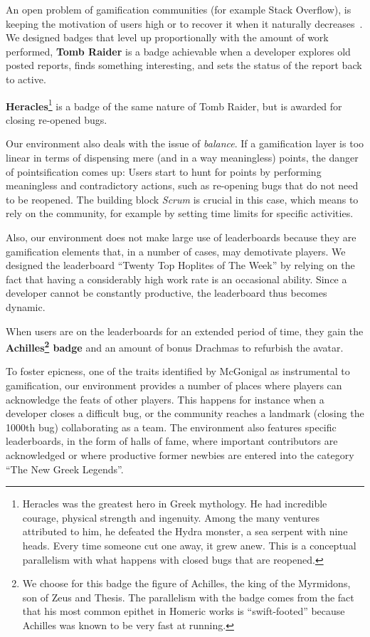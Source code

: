  An open problem of gamification communities (for example Stack Overflow), is keeping the motivation of users high or to recover it when it naturally decreases~\cite{Grant2013}.
We designed badges that level up proportionally with the amount of work performed, \eg \textbf{Tomb Raider} is a badge achievable when a developer explores old posted reports, finds something interesting, and sets the status of the report back to active.

 \textbf{Heracles}\footnote{Heracles was the greatest hero in Greek mythology.
He had incredible courage, physical strength and ingenuity.
Among the many ventures attributed to him, he defeated the Hydra monster, a sea serpent with nine heads.
Every time someone cut one away, it grew anew.
This is a conceptual parallelism with what happens with closed bugs that are reopened.} is a badge of the same nature of Tomb Raider, but is awarded for closing re-opened bugs.

Our environment also deals with the issue of \emph{balance}.
If a gamification layer is too linear in terms of dispensing mere (and in a way meaningless) points, the danger of pointsification comes up: Users start to hunt for points by performing meaningless and contradictory actions, such as re-opening bugs that do not need to be reopened.
The building block \emph{Scrum} is crucial in this case, which means to rely on the community, for example by setting time limits for specific activities.

Also, our environment does not make large use of leaderboards because they are gamification elements that, in a number of cases, may demotivate players.
We designed the leaderboard ``Twenty Top Hoplites of The Week'' by relying on the fact that having a considerably high work rate is an occasional ability.
Since a developer cannot be constantly productive, the leaderboard thus becomes dynamic.

 When users are on the leaderboards for an extended period of time, they gain the \textbf{Achilles\footnote{We choose for this badge the figure of Achilles, the king of the Myrmidons, son of Zeus and Thesis.
The parallelism with the badge comes from the fact that his most common epithet in Homeric works is ``swift-footed'' because Achilles was known to be very fast at running.} badge} and an amount of bonus Drachmas to refurbish the avatar.

To foster epicness, one of the traits identified by McGonigal as instrumental to gamification, our environment provides a number of places where players can acknowledge the feats of other players.
This happens for instance when a developer closes a difficult bug, or the community reaches a landmark (\eg closing the 1000th bug) collaborating as a team.
The environment also features specific leaderboards, in the form of halls of fame, where important contributors are acknowledged or where productive former newbies are entered into the category ``The New Greek Legends''.

